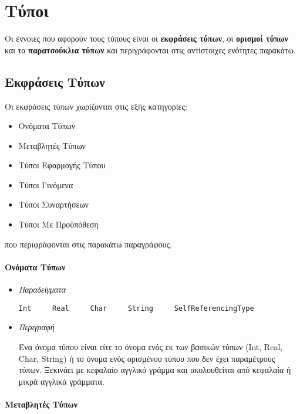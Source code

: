 \documentclass[diploma]{softlab-thesis}
\def\pend{\mbox{}\\\\}
\begin{document}
\section{Τύποι}
\label{subsec:typesgr}

Οι έννοιες που αφορούν τους τύπους είναι οι \textbf{εκφράσεις τύπων},
οι \textbf{ορισμοί τύπων} και τα \textbf{παρατσούκλια τύπων} και
περιγράφονται στις αντίστοιχες ενότητες παρακάτω.

\subsection{Εκφράσεις Τύπων}

Οι εκφράσεις τύπων χωρίζονται στις εξής κατηγορίες:
\begin{itemize}
\item Ονόματα Τύπων
\item Μεταβλητές Τύπων
\item Τύποι Εφαρμογής Τύπου
\item Τύποι Γινόμενα
\item Τύποι Συναρτήσεων
\item Τύποι Με Προϋπόθεση
\end{itemize}
που περιφράφονται στις παρακάτω παραγράφους.

\paragraph{Ονόματα Τύπων}

\begin{itemize}
\item \textit{Παραδείγματα}
\begin{verbatim}
Int     Real     Char     String     SelfReferencingType
\end{verbatim}

\item \textit{Περιγραφή}

Ένα όνομα τύπου είναι είτε το όνομα ενός εκ των βασικών τύπων
(Int, Real, Char, String) ή το όνομα ενός ορισμένου τύπου που δεν έχει
παραμέτρους τύπων. Ξεκινάει με κεφαλαίο αγγλικό γράμμα και ακολουθείται
από κεφαλαία ή μικρά αγγλικά γράμματα.

\end{itemize}

\newpage

\paragraph{Μεταβλητές Τύπων}\pend
\end{document}
